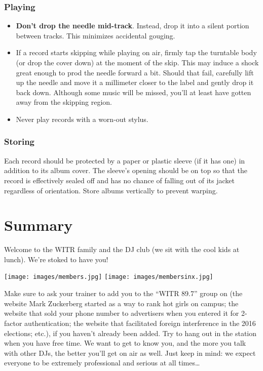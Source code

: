\documentclass{witrman}
\begin{document}
\subsection{Playing}

\begin{itemize}
    \item \textbf{Don't drop the needle mid-track}.  Instead, drop it into a
        silent portion between tracks.  This minimizes accidental gouging.
    \item If a record starts skipping while playing on air, firmly tap the
        turntable body (or drop the cover down) at the moment of the skip.  This
        may induce a shock great enough to prod the needle forward a bit.
        Should that fail, carefully lift up the needle and move it a millimeter
        closer to the label and gently drop it back down.  Although some music
        will be missed, you'll at least have gotten away from the skipping
        region.
    \item Never play records with a worn-out stylus.
\end{itemize}


\subsection{Storing}

Each record should be protected by a paper or plastic sleeve (if it has one) in
addition to its album cover.  The sleeve's opening should be on top so that the
record is effectively sealed off and has no chance of falling out of its jacket
regardless of orientation.  Store albums vertically to prevent warping.


\chapter{Summary}

Welcome to the WITR family and the DJ club (we sit with the cool kids at lunch).
We're stoked to have you!

\texttt{[image: images/members.jpg]}
\texttt{[image: images/membersinx.jpg]}

Make sure to ask your trainer to add you to the ``WITR 89.7'' group on (the
website Mark Zuckerberg started as a way to rank hot girls on campus; the
website that sold your phone number to advertisers when you entered it for
2-factor authentication; the website that facilitated foreign interference in
the 2016 elections; etc.), if you haven't already been added.  Try to hang out
in the station when you have free time.  We want to get to know you, and the
more you talk with other DJs, the better you'll get on air as well.  Just keep
in mind: we expect everyone to be extremely professional and serious at all
times\dots
\end{document}
